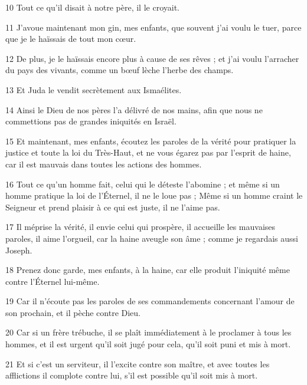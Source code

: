 \par 10 Tout ce qu'il disait à notre père, il le croyait.

\par 11 J'avoue maintenant mon gin, mes enfants, que souvent j'ai voulu le tuer, parce que je le haïssais de tout mon cœur.

\par 12 De plus, je le haïssais encore plus à cause de ses rêves ; et j'ai voulu l'arracher du pays des vivants, comme un bœuf lèche l'herbe des champs.

\par 13 Et Juda le vendit secrètement aux Ismaélites.

\par 14 Ainsi le Dieu de nos pères l'a délivré de nos mains, afin que nous ne commettions pas de grandes iniquités en Israël.

\par 15 Et maintenant, mes enfants, écoutez les paroles de la vérité pour pratiquer la justice et toute la loi du Très-Haut, et ne vous égarez pas par l'esprit de haine, car il est mauvais dans toutes les actions des hommes.

\par 16 Tout ce qu'un homme fait, celui qui le déteste l'abomine ; et même si un homme pratique la loi de l'Éternel, il ne le loue pas ; Même si un homme craint le Seigneur et prend plaisir à ce qui est juste, il ne l'aime pas.

\par 17 Il méprise la vérité, il envie celui qui prospère, il accueille les mauvaises paroles, il aime l'orgueil, car la haine aveugle son âme ; comme je regardais aussi Joseph.

\par 18 Prenez donc garde, mes enfants, à la haine, car elle produit l'iniquité même contre l'Éternel lui-même.

\par 19 Car il n'écoute pas les paroles de ses commandements concernant l'amour de son prochain, et il pèche contre Dieu.

\par 20 Car si un frère trébuche, il se plaît immédiatement à le proclamer à tous les hommes, et il est urgent qu'il soit jugé pour cela, qu'il soit puni et mis à mort.

\par 21 Et si c'est un serviteur, il l'excite contre son maître, et avec toutes les afflictions il complote contre lui, s'il est possible qu'il soit mis à mort.

